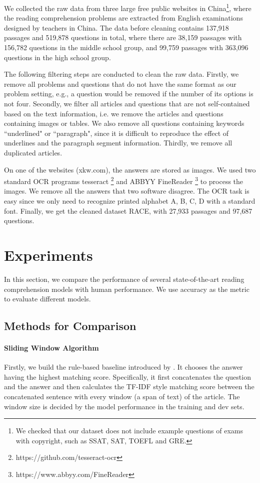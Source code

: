 We collected the raw data from three large  free public websites in China\footnote{We checked that our dataset does not include example questions of exams with copyright, such as SSAT, SAT, TOEFL and GRE.}, where the reading comprehension problems are extracted from English examinations designed by teachers in China. The data before cleaning contains 137,918 passages and 519,878 questions in total, where there are 38,159 passages with 156,782 questions in the middle school group, and 99,759 passages with 363,096 questions in the high school group. 

The following filtering steps are conducted to clean the raw data. Firstly, we remove all problems and questions that do not have the same format as our problem setting, e.g., a question would be removed if the number of its options is not four. Secondly, we filter all articles and questions that are not self-contained based on the text information, i.e. we remove the articles and questions containing images or tables. We also remove all questions containing keywords ``underlined" or ``paragraph", since it is difficult to reproduce the effect of underlines and the paragraph segment information. Thirdly, we remove all duplicated articles. 

On one of the websites (xkw.com), the answers are stored as images. We used two standard OCR programs tesseract \footnote{https://github.com/tesseract-ocr} and ABBYY FineReader \footnote{https://www.abbyy.com/FineReader} to process the images. We remove all the answers that two software disagree. The OCR task is easy since we only need to recognize printed alphabet A, B, C, D with a standard font. Finally, we get the cleaned dataset RACE, with 27,933 passages and 97,687 questions. 

\section{Experiments}
\label{sec:experiment}

In this section, we compare the performance of several state-of-the-art reading comprehension models with human performance. We use accuracy as the metric to evaluate different models.

\subsection{Methods for Comparison}
\paragraph{Sliding Window Algorithm} Firstly, we build the rule-based baseline introduced by \citet{richardson2013mctest}. It chooses the answer having the highest matching score. Specifically, it first concatenates the question and the answer and then calculates the TF-IDF style matching score between the concatenated sentence with every window (a span of text) of the article. The window size is decided by the model performance in the training and dev sets. 

